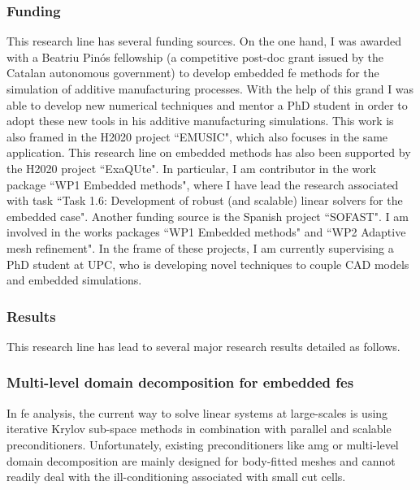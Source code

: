 \documentclass{article}
\begin{document}
\subsubsection{Funding}

This research line has several funding sources. On the one hand, I was awarded with a Beatriu Pinós fellowship (a competitive post-doc grant issued by the Catalan autonomous government) to develop embedded \ac{fe} methods for the simulation of additive manufacturing processes. With the help of this grand I was able to develop new numerical techniques and mentor a PhD student in order to adopt these new tools in his additive manufacturing simulations. This work is also framed in the  H2020 project ``EMUSIC", which also focuses in the same application.  This research line  on embedded methods has also been supported by the  H2020 project ``ExaQUte". In particular, I am contributor in the work package ``WP1 Embedded methods", where I have lead the research associated with task ``Task 1.6: Development of robust (and scalable) linear solvers for the embedded case". Another funding source is the Spanish project  ``SOFAST".  I am involved in the works packages ``WP1 Embedded methods" and ``WP2 Adaptive mesh refinement". In the frame of these projects, I am currently supervising a PhD student at UPC, who is developing novel techniques to couple CAD models and embedded simulations.


\subsubsection{Results}

This research line has lead to several major research results detailed as follows.

\subsubsection{Multi-level domain decomposition for embedded \acp{fe}} \label{sec:unf-BDDC}

In \ac{fe} analysis, the current way to solve linear systems at large-scales is using iterative Krylov sub-space methods in combination with parallel and scalable preconditioners. Unfortunately, existing preconditioners like \ac{amg} \cite{Briggs2000} or multi-level domain decomposition \cite{Toselli2005} are mainly designed for body-fitted meshes and cannot readily deal with the ill-conditioning associated with small cut cells. 
\end{document}
